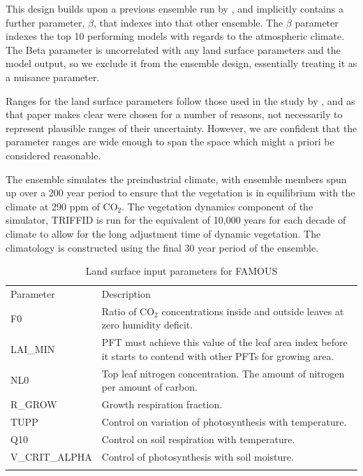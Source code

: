 \documentclass[esd, manuscript]{copernicus}
\begin{document}
This design builds upon a previous ensemble run by \cite{gregoire2010optimal}, and implicitly contains a further parameter, $\beta$, that indexes into that other ensemble. The $\beta$ parameter  indexes the top 10 performing models with regards to the atmospheric climate. The Beta parameter is uncorrelated with any land surface parameters and the model output, so we exclude it from the ensemble design, essentially treating it as a nuisance parameter.

Ranges for the land surface parameters follow those used in the study by \cite{booth2012highsensitivity}, and as that paper makes clear were chosen for a number of reasons, not necessarily to represent plausible ranges of their uncertainty. However, we are confident that the parameter ranges are wide enough to span the space which might a priori be considered reasonable.

The ensemble simulates the preindustrial climate, with ensemble members spun up over a 200 year period to ensure that the vegetation is in equilibrium with the climate at 290 ppm of CO$_{2}$. The vegetation dynamics component of the simulator, TRIFFID is run for the equivalent of 10,000 years for each decade of climate to allow for the long adjustment time of dynamic vegetation. The climatology is constructed using the final 30 year period of the ensemble. 


\begin{table}[t]
\caption{Land surface input parameters for FAMOUS}\label{tab:params}
\begin{tabular}{ll}

\tophline
Parameter &  Description \\
F0              &    Ratio of CO$_2$ concentrations inside and outside leaves at zero humidity deficit. \\
LAI\_MIN    &      PFT must achieve this value of the leaf area index before it starts to contend with other PFTs for growing area. \\
NL0           &      Top leaf nitrogen concentration. The amount of nitrogen per amount of carbon. \\
R\_GROW    &       Growth respiration fraction. \\
TUPP        &    Control on variation of photosynthesis with temperature. \\
Q10           &     Control on soil respiration with temperature. \\
V\_CRIT\_ALPHA  & Control of photosynthesis with soil moisture. \\
\bottomhline
\end{tabular}
\belowtable{} %
\end{table}
\end{document}
